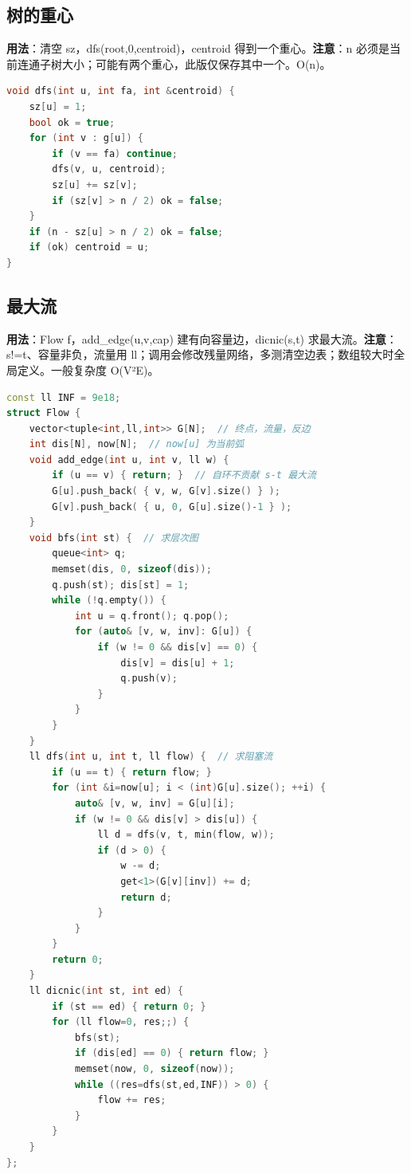 \documentclass[a4paper,9pt]{extarticle}
\begin{document}
\subsection{树的重心}

\textbf{用法}：清空 sz，dfs(\allowbreak{}root,\allowbreak{}0,\allowbreak{}centroid)，centroid 得到一个重心。\textbf{注意}：n 必须是当前连通子树大小；可能有两个重心，此版仅保存其中一个。O(\allowbreak{}n)。
\begin{lstlisting}[language={C++}]
void dfs(int u, int fa, int &centroid) {
    sz[u] = 1;
    bool ok = true;
    for (int v : g[u]) {
        if (v == fa) continue;
        dfs(v, u, centroid);
        sz[u] += sz[v];
        if (sz[v] > n / 2) ok = false;
    }
    if (n - sz[u] > n / 2) ok = false;
    if (ok) centroid = u;
}
\end{lstlisting}

\subsection{最大流}

\textbf{用法}：Flow f，add\_\allowbreak{}edge(\allowbreak{}u,\allowbreak{}v,\allowbreak{}cap) 建有向容量边，dicnic(\allowbreak{}s,\allowbreak{}t) 求最大流。\textbf{注意}：s!=\allowbreak{}t、容量非负，流量用 ll；调用会修改残量网络，多测清空边表；数组较大时全局定义。一般复杂度 O(V²E)。

\begin{lstlisting}[language={C++}]
const ll INF = 9e18; 
struct Flow {
    vector<tuple<int,ll,int>> G[N];  // 终点，流量，反边
    int dis[N], now[N];  // now[u] 为当前弧
    void add_edge(int u, int v, ll w) {
        if (u == v) { return; }  // 自环不贡献 s-t 最大流
        G[u].push_back( { v, w, G[v].size() } );
        G[v].push_back( { u, 0, G[u].size()-1 } );
    }
    void bfs(int st) {  // 求层次图
        queue<int> q;
        memset(dis, 0, sizeof(dis));
        q.push(st); dis[st] = 1;
        while (!q.empty()) {
            int u = q.front(); q.pop();
            for (auto& [v, w, inv]: G[u]) {
                if (w != 0 && dis[v] == 0) {
                    dis[v] = dis[u] + 1;
                    q.push(v);
                }
            }
        }
    }
    ll dfs(int u, int t, ll flow) {  // 求阻塞流
        if (u == t) { return flow; }
        for (int &i=now[u]; i < (int)G[u].size(); ++i) {
            auto& [v, w, inv] = G[u][i];
            if (w != 0 && dis[v] > dis[u]) {
                ll d = dfs(v, t, min(flow, w));
                if (d > 0) {
                    w -= d;
                    get<1>(G[v][inv]) += d;
                    return d;
                }
            }
        }
        return 0;
    }
    ll dicnic(int st, int ed) {
        if (st == ed) { return 0; }
        for (ll flow=0, res;;) {
            bfs(st);
            if (dis[ed] == 0) { return flow; }
            memset(now, 0, sizeof(now));
            while ((res=dfs(st,ed,INF)) > 0) {
                flow += res;
            }
        }
    }
};
\end{lstlisting}
\end{document}
